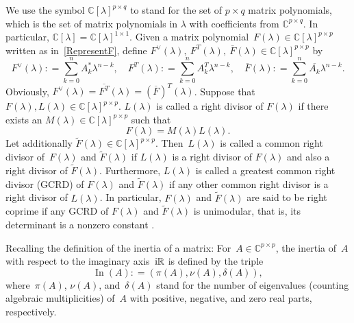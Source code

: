 \documentclass[12pt,reqno]{amsart}
\theoremstyle{plain}
\numberwithin{equation}{section}
\theoremstyle{remark}
\def\wtilde{\widetilde} \def\what{\widehat}
\newcommand{\coloneqq}{\mathrel{\mathop:}=}
\newcommand{\R}{\mathbb{R}}
\newcommand{\In}{\operatorname{In}}
\begin{document}
We use the symbol $\mathbb C[\lambda]^{p\times q}$ to stand for the set of $p\times q$ matrix polynomials, which is the set of matrix polynomials in $\lambda$ with coefficients from $\mathbb C^{p\times q}$. In particular, $\mathbb C[\lambda]=\mathbb C[\lambda]^{1\times 1}$. 
Given a matrix polynomial~$F(\lambda)\in\mathbb C[\lambda]^{p\times p}$ written as
in~\eqref{RepresentF}, define $F^{\vee}(\lambda),\ F^{T}(\lambda),\ \overline{F}(\lambda)\in\mathbb C[\lambda]^{p\times p}$ by
\begin{equation*}
F^{\vee}(\lambda)\coloneqq\sum_{k=0}^n A^*_k \lambda^{n-k},\quad F^{T}(\lambda)\coloneqq\sum_{k=0}^n A^T_k \lambda^{n-k},\quad \overline{F}(\lambda)\coloneqq\sum_{k=0}^n \overline{A_k} \lambda^{n-k}.
\end{equation*}
Obviously, $F^{\vee}(\lambda)=\overline{F^{T}}(\lambda)=(\overline{F})^{T}(\lambda)$.
Suppose that $F(\lambda), L(\lambda)\in \mathbb C[\lambda]^{p\times p}$. $L(\lambda)$ is called a right divisor
of $F(\lambda)$ 
if there exists an
    $M(\lambda)\in \mathbb C[\lambda]^{p\times p}$ such that
    \begin{equation*}
        F(\lambda)=M(\lambda)L(\lambda).
    \end{equation*}
    Let additionally $\wtilde F(\lambda)\in \mathbb C[\lambda]^{p\times p}$. Then~$L(\lambda)$ is called a common right divisor
of~$F(\lambda)$ and $\wtilde F(\lambda)$ if
    $L(\lambda)$ is a right  divisor of $F(\lambda)$ and also a right  divisor of
    $\wtilde F(\lambda)$.
  Furthermore, $L(\lambda)$ is called a greatest
    common right divisor (GCRD) of $F(\lambda)$ and $\wtilde F(\lambda)$
    if any other  common right divisor is a right divisor of $L(\lambda)$. In particular, $F(\lambda)$ and $\wtilde F(\lambda)$ are said to be right coprime if any  
   GCRD of $F(\lambda)$ and $\wtilde F(\lambda)$ is unimodular, that is, its determinant is a nonzero constant \cite{NV,Kai}. 


 Recalling the definition of the inertia of a matrix: For~$A\in \mathbb C^{p\times p}$, the
inertia of~$A$ with respect to the imaginary axis~${\rm i}\R$ is defined by the
triple \label{PagInertia}
\begin{equation*}
\In(A)\coloneqq(\pi(A),\nu(A),\delta(A)),
\end{equation*}
where~$\pi(A)$, $\nu(A)$, and~$\delta(A)$ stand for the number of eigenvalues (counting
algebraic multiplicities) of~$A$ with positive, negative, and zero real parts, respectively.
\end{document}
